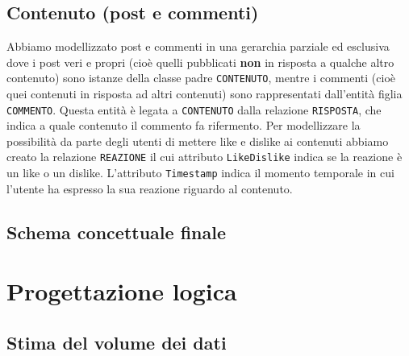 \documentclass[a4paper,12pt]{report}
\begin{document}
\section{Contenuto (post e commenti)}
Abbiamo modellizzato post e commenti in una gerarchia parziale ed esclusiva dove i post veri e propri (cioè quelli pubblicati \textbf{non} in risposta a qualche altro contenuto) sono istanze della classe padre \texttt{CONTENUTO}, mentre i commenti (cioè quei contenuti in risposta ad altri contenuti) sono rappresentati dall'entità figlia \texttt{COMMENTO}. Questa entità è legata a \texttt{CONTENUTO} dalla relazione \texttt{RISPOSTA}, che indica a quale contenuto il commento fa rifermento.
Per modellizzare la possibilità da parte degli utenti di mettere like e dislike ai contenuti abbiamo creato la relazione \texttt{REAZIONE} il cui attributo \texttt{LikeDislike} indica se la reazione è un like o un dislike. L'attributo \texttt{Timestamp} indica il momento temporale in cui l'utente ha espresso la sua reazione riguardo al contenuto. 
\section{Schema concettuale finale}
\chapter{Progettazione logica}
\section{Stima del volume dei dati}
\end{document}
